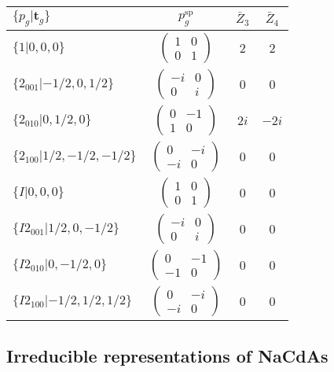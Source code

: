 \documentclass[3p,preprint]{elsarticle}
\newcommand{\bt}{\bm{t}}
\begin{document}
\begin{table}[H]
	\begin{tabular}{|l|c||c|c|}\hline
			$\{p_g|\bt_g\}$ & $p_g^{\text{sp}}$ & $\bar{Z}_3$ & $\bar{Z}_4$  \\ \hline \hline
			$\{1|0,0,0\}$ & 					$\left(\begin{array}{cc} 1&0 \\ 0&1 \end{array}\right)$	& $2$ &  $2$ \\ \hline
			$\{2_{001}|-1/2,0,1/2\}$ &		$\left(\begin{array}{cc} -i&0 \\ 0&i \end{array}\right)$	& $0$ & $0$  \\ \hline
			$\{2_{010}|0,1/2,0\}$ &			$\left(\begin{array}{cc} 0&-1 \\ 1&0 \end{array}\right)$	& $2i$ & $-2i$\\ \hline
			$\{2_{100}|1/2,-1/2,-1/2\}$ &		$\left(\begin{array}{cc} 0&-i \\ -i&0 \end{array}\right)$	& $0$ & $0$\\ \hline
			$\{I|0,0,0\}$ & 						$\left(\begin{array}{cc} 1&0 \\ 0&1 \end{array}\right)$	& $0$ &  $0$\\ \hline
			$\{I2_{001}|1/2,0,-1/2\}$ &		$\left(\begin{array}{cc} -i&0 \\ 0&i \end{array}\right)$	& $0$ & $0$  \\ \hline
			$\{I2_{010}|0,-1/2,0\}$ &			$\left(\begin{array}{cc} 0&-1 \\ -1&0 \end{array}\right)$	&  $0$ & $0$\\ \hline
			$\{I2_{100}|-1/2,1/2,1/2\}$ &		$\left(\begin{array}{cc} 0&-i \\ -i&0 \end{array}\right)$	& $0$ & $0$\\ \hline
	\end{tabular}
\end{table}

\subsection{Irreducible representations of NaCdAs}\label{app:b-NaCdAs}
\end{document}
